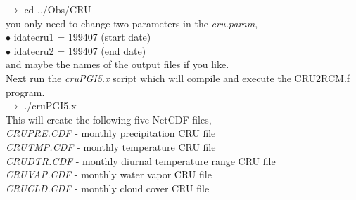 \indent 
$\rightarrow$   cd ../Obs/CRU \\

\noindent
you only need to change two parameters in the {\it cru.param}, \\

\indent 
$\bullet$   idatecru1 = 199407  (start date) \\
\indent 
$\bullet$   idatecru2 = 199407  (end date) \\

\noindent
and maybe the names of the output files if you like. \\

\noindent
Next run the {\it cruPGI5.x} script which will compile and execute the 
CRU2RCM.f program. \\

\indent 
$\rightarrow$   ./cruPGI5.x \\

\noindent
This will create the following five NetCDF files, \\

{\it CRUPRE.CDF} - monthly precipitation CRU file  \\
\indent
{\it CRUTMP.CDF} - monthly temperature CRU file  \\
\indent
{\it CRUDTR.CDF} - monthly diurnal temperature range CRU file\\
\indent
{\it CRUVAP.CDF} - monthly water vapor CRU file \\
\indent
{\it CRUCLD.CDF} - monthly cloud cover CRU file \\
